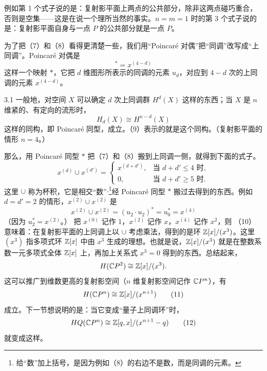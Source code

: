 例如第 1 个式子说的是：复射影平面上两点的公共部分，除非这两点碰巧重合，否则是空集——这是在说一个理所当然的事实。$n=m=1$ 时的第 3 个式子说的是：复射影平面自身与一点 $P$ 的公共部分就是一点 $P$。

为了把（7）和（8）看得更清楚一些，我们用“Poincaré 对偶”把“同调”改写成“上同调”。Poincaré 对偶是
\begin{equation}
[u_d]^* = x^{(4-d)} \tag{9}
\end{equation}
这样一个映射 $*$，它把 $d$ 维图形所表示的同调的元素 $u_d$，对应到 $4-d$ 次的上同调的元素 $x^{(4-d)}$。

\begin{remark}{3.1}
一般地，对空间 $X$ 可以确定 $d$ 次上同调群 $H^d(X)$ 这样的东西；当 $X$ 是 $n$ 维紧的、有定向的流形时，
\[
H_d(X) \cong H^{n-d}(X)
\]
这样的同构，即 Poincaré 同型，成立。（9）表示的就是这个同构。（复射影平面的情形 $n=4$。）
\end{remark}

那么，用 Poincaré 同型 $*$ 把（7）和（8）搬到上同调一侧，就得到下面的式子。
\begin{equation}
x^{(d)} \cup x^{(d')} =
\begin{cases}
x^{(d+d')}, & \text{当 $d+d' \le 4$ 时}, \\
0, & \text{当 $d+d' \ge 5$ 时}.
\end{cases}
\tag{10}
\end{equation}
这里 $\cup$ 称为杯积，它是相交“数”$\cdot$\footnote{给“数”加上括号，是因为例如（8）的右边不是数，而是同调的元素。}经 Poincaré 同型 $*$ 搬过去得到的东西。例如 $d=d'=2$ 的情形，$x^{(2)}\cup x^{(2)}$ 是
\[
x^{(2)}\cup x^{(2)} = (u_2\cdot u_2)^* = u_0^* = x^{(4)}
\]
（因为 $u_2^* = x^{(2)}$。）
把 $x^{(0)}$ 记作 $1$，$x^{(2)}$ 记作 $x$，$x^{(4)}$ 记作 $x^2$，则
（10）意味着：在复射影平面的上同调上以 $\cup$ 考虑乘法，得到的是环 $\mathbb{Z}[x]/(x^3)$。这里 $(x^3)$ 指多项式环 $\mathbb{Z}[x]$ 中由 $x^3$ 生成的理想。也就是说，$\mathbb{Z}[x]/(x^3)$ 就是在整数系数一元多项式全体 $\mathbb{Z}[x]$ 上，再加上关系式 $x^3=0$ 得到的东西。总结起来，
\[
H(\mathbb{C}P^2) \cong \mathbb{Z}[x]/(x^3).
\]
这可以推广到维数更高的复射影空间（$n$ 维复射影空间记作 $\mathbb{C}P^n$），有
\begin{equation}
H(\mathbb{C}P^n) \cong \mathbb{Z}[x]/(x^{n+1}) \tag{11}
\end{equation}
成立。下一节想说明的是：当它变成“量子上同调环”时，
\begin{equation}
HQ(\mathbb{C}P^n) \cong \mathbb{Z}[q,x]/(x^{n+1}-q) \tag{12}
\end{equation}
就变成这样。

